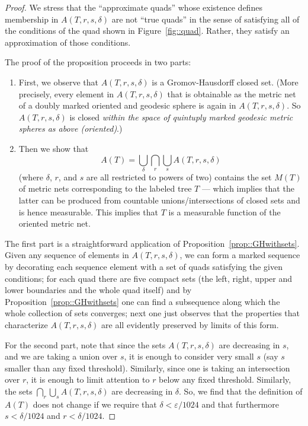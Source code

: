 \documentclass[JEP,XML,SOM,Unicode]{cedram}
\let\epsilon\varepsilon
\theoremstyle{plain}
\numberwithin{theorem}{section}
\theoremstyle{definition}
\begin{document}
\begin{proof}
We stress that the ``approximate quads'' whose existence defines membership in $A(T,r,s,\delta)$ are not ``true quads'' in the sense of satisfying all of the conditions of the quad shown in Figure~\ref{fig::quad}. Rather, they satisfy an approximation of those conditions.

The proof of the proposition proceeds in two parts:
\begin{enumerate}
\item First, we observe that $A(T,r,s,\delta)$ is a Gromov-Hausdorff closed set. (More precisely, every element in $A(T,r,s,\delta)$ that is obtainable as the metric net of a doubly marked oriented and geodesic sphere is again in $A(T,r,s,\delta)$. So $A(T,r,s,\delta)$ is closed \emph{within the space of quintuply marked geodesic metric spheres as above (\ie oriented)}.)
\item
Then we show that\vspace*{-6pt}\enlargethispage{.7\baselineskip}%
\[
A(T) = \bigcup_\delta \bigcap_r \bigcup_s A(T,r,s,\delta)
\]
(where $\delta$, $r$, and $s$ are all restricted to powers of two) contains the set $M(T)$ of metric nets corresponding to the labeled tree $T$ --- which implies that the latter can be produced from countable unions/intersections of closed sets and is hence measurable. This implies that $T$ is a measurable function of the oriented metric net.
\end{enumerate}

The first part is a straightforward application of Proposition~\ref{prop::GHwithsets}. Given any sequence of elements in $A(T,r,s,\delta)$, we can form a marked sequence by decorating each sequence element with a set of quads satisfying the given conditions; for each quad there are five compact sets (the left, right, upper and lower boundaries and the whole quad itself) and by Proposition~\ref{prop::GHwithsets} one can find a subsequence along which the whole collection of sets converges; next one just observes that the properties that characterize $A(T,r,s,\delta)$ are all evidently preserved by limits of this form.

For the second part, note that since the sets $A(T,r,s,\delta)$ are decreasing in $s$, and we are taking a union over $s$, it is enough to consider very small $s$ (say $s$ smaller than any fixed threshold). Similarly, since one is taking an intersection over $r$, it is enough to limit attention to $r$ below any fixed threshold. Similarly, the sets $ \bigcap_r \bigcup_s A(T,r,s,\delta)$ are decreasing in $\delta$. So, we find that the definition of $A(T)$ does not change if we require that $\delta < \epsilon/1024$ and that furthermore $s < \delta /1024$ and $r < \delta / 1024$.


\end{proof}
\end{document}
